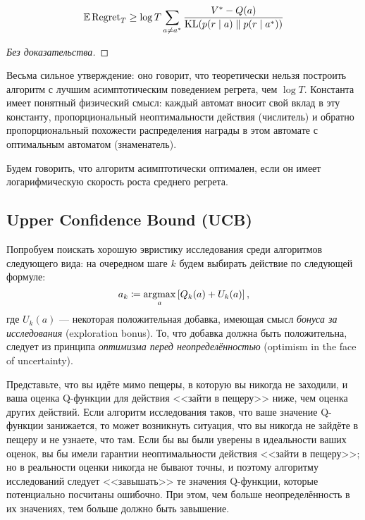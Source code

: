 \begin{theorem}
$$\mathbb{E} \operatorname{Regret}_T \ge \log T \sum_{a \ne a^*} \frac{V^* - Q(a)}{\operatorname{KL}(p(r \mid a) \parallel p(r \mid a^*))}$$
\begin{proof}[Без доказательства]
\end{proof}
\end{theorem}

Весьма сильное утверждение: оно говорит, что теоретически нельзя построить алгоритм с лучшим асимптотическим поведением регрета, чем $\log T$. Константа имеет понятный физический смысл: каждый автомат вносит свой вклад в эту константу, пропорциональный неоптимальности действия (числитель) и обратно пропорциональный похожести распределения награды в этом автомате с оптимальным автоматом (знаменатель). 

Будем говорить, что алгоритм асимптотически оптимален, если он имеет логарифмическую скорость роста среднего регрета.

\subsection{Upper Confidence Bound (UCB)}\label{subsec:ucb}

Попробуем поискать хорошую эвристику исследования среди алгоритмов следующего вида: на очередном шаге $k$ будем выбирать действие по следующей формуле:
\begin{equation}\label{ucb_exploration}
a_k \coloneqq \mathop{\mathrm{argmax}}_a \left[ Q_k(a) + U_k(a) \right],
\end{equation}
где $U_k(a)$ --- некоторая положительная добавка, имеющая смысл \emph{бонуса за исследования} (exploration bonus). То, что добавка должна быть положительна, следует из принципа \emph{оптимизма перед неопределённостью} (optimism in the face of uncertainty).

\begin{example}
Представьте, что вы идёте мимо пещеры, в которую вы никогда не заходили, и ваша оценка Q-функции для действия <<зайти в пещеру>> ниже, чем оценка других действий. Если алгоритм исследования таков, что ваше значение Q-функции занижается, то может возникнуть ситуация, что вы никогда не зайдёте в пещеру и не узнаете, что там. Если бы вы были уверены в идеальности ваших оценок, вы бы имели гарантии неоптимальности действия <<зайти в пещеру>>; но в реальности оценки никогда не бывают точны, и поэтому алгоритму исследований следует <<завышать>> те значения Q-функции, которые потенциально посчитаны ошибочно. При этом, чем больше неопределённость в их значениях, тем больше должно быть завышение.
\end{example}

